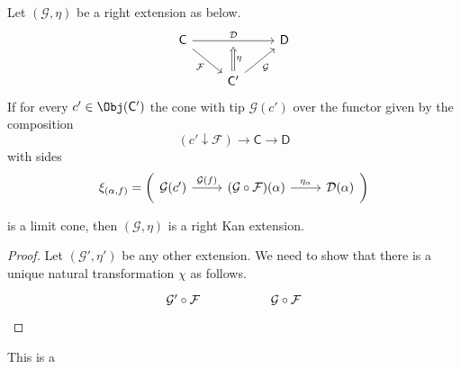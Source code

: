 \documentclass[notes.tex]{subfiles}
\begin{document}
\begin{lemma}
  \label{lemma:extension_whose_cones_are_limits_is_kan}
  Let $(\mathcal{G}, \eta)$ be a right extension as below.
  \begin{equation*}
    \begin{tikzcd}
      \mathsf{C}
      \arrow[dr, swap, "\mathcal{F}"]
      \arrow[rr, "\mathcal{D}", ""'{name=U}]
      && \mathsf{D}
      \\
      & \mathsf{C'}
      \arrow[ur, swap, "\mathcal{G}"]
      \arrow[d, to=U, Rightarrow, swap, "\eta"]
    \end{tikzcd}
  \end{equation*}
  If for every $c' \in \Obj(\mathsf{C'})$ the cone with tip $\mathcal{G}(c')$ over the functor given by the composition
  \begin{equation*}
    (c' \downarrow \mathcal{F}) \to \mathsf{C} \to \mathsf{D}
  \end{equation*}
  with sides
  \begin{equation*}
    \xi_{(\alpha, f)} = \left( \begin{tikzcd} \mathcal{G}(c') \arrow[r, "\mathcal{G}(f)"] & (\mathcal{G} \circ \mathcal{F})(\alpha) \arrow[r, "\eta_{\alpha}"] & \mathcal{D}(\alpha) \end{tikzcd} \right)
  \end{equation*}

  is a limit cone, then $(\mathcal{G}, \eta)$ is a right Kan extension.
\end{lemma}
\begin{proof}
  Let $(\mathcal{G}', \eta')$ be any other extension. We need to show that there is a unique natural transformation $\chi$ as follows.
  \begin{equation*}
    \begin{tikzcd}
      \mathcal{G}' \circ \mathcal{F}
      && \mathcal{G} \circ \mathcal{F}
    \end{tikzcd}
  \end{equation*}
\end{proof}

This is a
\end{document}
